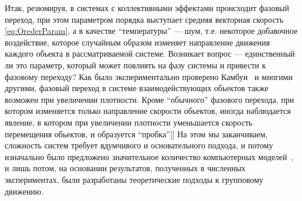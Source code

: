     Итак, резюмируя, в системах с коллективными эффектами происходит фазовый переход, при этом параметром порядка выступает средняя векторная скорость \ref{eq:OrederParam}, а в качестве ``температуры'' --- шум, т.е. некоторое добавочное воздействие, которое случайным образом изменяет направление движения каждого обьекта в рассматриваемой системе. Возникает вопрос --- единственный ли это параметр, который может повлиять на фазу системы и привести к фазовому переходу? Как было экспериментально проверено Камбуи~\cite{cambui2012} и многими другими, фазовый переход в системе взаимодействующих обьектов также возможен при увеличении плотности. Кроме ``обычного'' фазового перехода, при котором изменяется только направление скорости обьектов, иногда наблюдается явление, в котором при увеличении плотности уменьшается скорость перемещения обьектов, и образуется ``пробка''[] 
    На этом мы заканчиваем, сложность систем требует вдумчивого и основательного подхода, и потому изначально было предложено значительное количество компьютерных моделей~\cite{reynolds1987,vicsek1995,gregoire2004,nagy2007,schubring2013}, и лишь потом, на основании результатов, полученных в численных экспериментах, были разработаны теоретические подходы к групповому движению.~\cite{tu2000,kulinskii2005,bertin2006,ratushnaya2007,vicsek2007,chepizhko2013,kulinskii2014}

